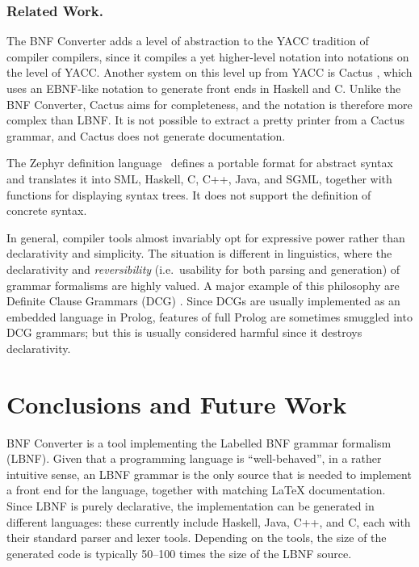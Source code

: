\documentclass{llncs}
\newcommand{\shortsection}[1]{\subsubsection*{#1.}} %
\begin{document}


\shortsection{Related Work}

The BNF Converter adds a level of abstraction to the YACC \cite{johnson-yacc} 
tradition of compiler compilers,
since it compiles a yet higher-level notation into
notations on the level of YACC.
Another system on this 
level up from YACC is Cactus \cite{Cactus},
which uses an EBNF-like notation to 
generate front ends in Haskell and C.
Unlike the BNF Converter, Cactus aims for completeness,
and the notation is therefore more complex than LBNF. 
It is not possible to extract a pretty printer from a Cactus grammar, 
and Cactus does not generate documentation.

The Zephyr definition language 
\cite{zephyr}\ defines a portable format for abstract syntax
and translates it into SML, Haskell, C, C++,
Java, and SGML, together with functions for displaying syntax trees. It does not support the definition of concrete syntax.

In general, compiler tools almost invariably opt for expressive power 
rather than declarativity and simplicity.
The situation is different in linguistics, where
the declarativity and \textit{reversibility} (i.e.\ usability for both
parsing and generation) of grammar formalisms are highly valued. A major 
example of this philosophy are Definite Clause Grammars (DCG) 
\cite{dcg}. Since DCGs are usually implemented as an embedded 
language in Prolog, 
features of full Prolog are sometimes smuggled into DCG grammars;
but this is usually considered harmful since it destroys
declarativity.



\section{Conclusions and Future Work}

BNF Converter is a tool implementing the Labelled BNF grammar formalism
(LBNF). Given that a programming language is
``well-behaved'', in a rather intuitive sense, an
LBNF grammar is the only source that is needed to implement
a front end for the language, together with matching
LaTeX documentation. Since LBNF is purely declarative, 
the implementation can be generated in different languages:
these currently include Haskell, Java, C++, and C, each with
their standard parser and lexer tools. Depending on
the tools, the size of the generated code is typically 
50--100 times the size of the LBNF source.
\end{document}
